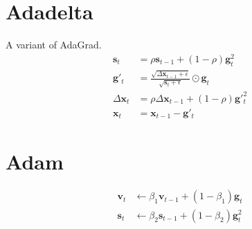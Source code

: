 \section{Adadelta}
A variant of AdaGrad.
\begin{equation}
    \begin{split}
        \mathbf{s}_t &= \rho \mathbf{s}_{t-1} + (1-\rho)\mathbf{g}^2_t \\
        \mathbf{g}'_t &= \frac{\sqrt{\Delta \mathbf{x}_{t-1} + \epsilon}}{\sqrt{\mathbf{s}_t + \epsilon}} \odot \mathbf{g}_t\\
        \Delta \mathbf{x}_t &= \rho \Delta \mathbf{x}_{t-1} + (1 - \rho)\mathbf{g}'^2_t\\
        \mathbf{x}_t &= \mathbf{x}_{t-1} - \mathbf{g}'_t
    \end{split}
\end{equation}

\section{Adam}
\begin{equation}
    \begin{split}
        \mathbf{v}_t &\leftarrow \beta_1 \mathbf{v}_{t-1} + (1-\beta_1)\mathbf{g}_t \\
        \mathbf{s}_t &\leftarrow \beta_2 \mathbf{s}_{t-1} + (1-\beta_2)\mathbf{g}^2_t 
    \end{split}
\end{equation}